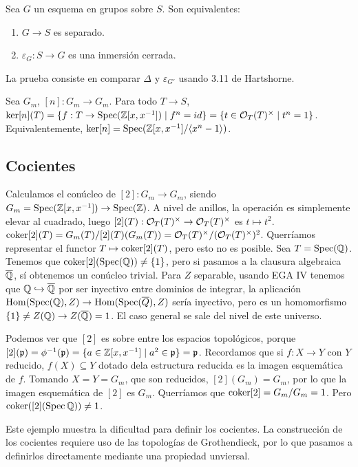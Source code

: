 \documentclass[GA.tex]{subfiles}
\begin{document}
\begin{prop}
Sea $G$ un esquema en grupos sobre $S$. Son equivalentes:
\begin{enumerate}
\item $G\to S$ es separado.
\item $\varepsilon_G:S\to G$ es una inmersión cerrada. 
\end{enumerate}
\end{prop}
La prueba consiste en comparar $\Delta$ y $\varepsilon_{G'}$ usando 3.11 de Hartshorne. 
\begin{ej}
Sea $G_m$, $[n]:G_m\to G_m$. Para todo $T\to S$, $\ker[n](T)=\{f:T\to \operatorname{Spec}(\mathbb{Z}[x,x^{-1}])\mid f^n=id\}=\{t\in{\mathcal O}_T(T)^\times\mid t^n=1\}$. Equivalentemente, $\ker[n]=\operatorname{Spec}(\mathbb{Z}[x,x^{-1}]/\langle{x^n-1}\rangle)$. 
\end{ej}

\subsection{Cocientes}

\begin{ej}
Calculamos el conúcleo de $[2]:G_m\to G_m$, siendo $G_m=\operatorname{Spec}(\mathbb{Z}[x,x^{-1}])\to\operatorname{Spec}(\mathbb{Z})$. A nivel de anillos, la operación es simplemente elevar al cuadrado, luego $[2](T):{\mathcal O}_T(T)^\times\to{\mathcal O}_T(T)^\times$ es $t\mapsto t^2$. $\operatorname{coker}[2](T)=G_m(T)/[2](T)(G_m(T))={\mathcal O}_T(T)^\times/({\mathcal O}_T(T)^\times)^2$. Querríamos representar el functor $T\mapsto \operatorname{coker}[2](T)$, pero esto no es posible. Sea $T=\operatorname{Spec}(\mathbb{Q})$. Tenemos que $\operatorname{coker}[2](\operatorname{Spec}(\mathbb{Q}))\neq\{1\}$, pero si pasamos a la clausura algebraica $\overline{\mathbb{Q}}$, sí obtenemos un conúcleo trivial. Para $Z$ separable, usando EGA IV tenemos que $\mathbb{Q}\hookrightarrow \overline{\mathbb{Q}}$ por ser inyectivo entre dominios de integrar, la aplicación $\operatorname{Hom}(\operatorname{Spec}(\mathbb{Q}),Z)\to\operatorname{Hom}(\operatorname{Spec}(\overline{Q}),Z)$ sería inyectivo, pero es un homomorfismo $\{1\}\neq Z(\mathbb{Q})\to Z(\overline{\mathbb{Q}})=1$. El caso general se sale del nivel de este universo. 

Podemos ver que $[2]$ es sobre entre los espacios topológicos, porque $[2]({\mathfrak{p}})=\phi^{-1}({\mathfrak{p}})=\{a\in\mathbb{Z}[x,x^{-1}]\mid a^2\in{\mathfrak{p}}\}={\mathfrak{p}}$. Recordamos que si $f:X\to Y$ con $Y$ reducido, $f(X)\subseteq Y$ dotado dela estructura reducida es la imagen esquemática de $f$. Tomando $X=Y=G_m$, que son reducidos, $[2](G_m)=G_m$, por lo que la imagen esquemática de $[2]$ es $G_m$. Querríamos que $\operatorname{coker}[2]=G_m/G_m=1$. Pero $\operatorname{coker}([2](\operatorname{Spec}\mathbb{Q}))\neq 1$. 
\end{ej}

Este ejemplo muestra la dificultad para definir los cocientes. La construcción de los cocientes requiere uso de las topologías de Grothendieck, por lo que pasamos a definirlos directamente mediante una propiedad unviersal. 
\end{document}
